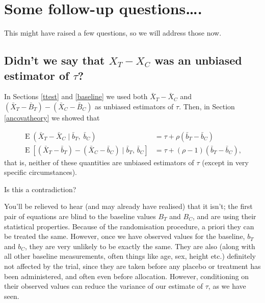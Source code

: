 \documentclass[
  openany]{book}
\theoremstyle{definition}
\theoremstyle{definition}
\theoremstyle{definition}
\theoremstyle{definition}
\theoremstyle{remark}
\begin{document}
\section{Some follow-up questions\ldots.}\label{some-follow-up-questions.}

This might have raised a few questions, so we will address those now.

\subsection{\texorpdfstring{Didn't we say that \(X_T - X_C\) was an unbiased estimator of \(\tau\)?}{Didn't we say that X\_T - X\_C was an unbiased estimator of \textbackslash tau?}}\label{didnt-we-say-that-x_t---x_c-was-an-unbiased-estimator-of-tau}

In Sections \ref{ttest} and \ref{baseline} we used both \(\bar{X}_T - \bar{X}_C\) and \(\left(\bar{X}_T - \bar{B}_T\right) - \left(\bar{X}_C - \bar{B}_C\right)\) as unbiased estimators of \(\tau\).
Then, in Section \ref{ancovatheory} we showed that

\[
\begin{aligned}
\operatorname{E}\left(\bar{X}_T - \bar{X}_C\mid{\bar{b}_T,\;\bar{b}_C}\right)& = \tau + \rho\left(\bar{b}_T - \bar{b}_C\right)\\
\operatorname{E}\left[\left(\bar{X}_T - \bar{b}_T\right) - \left(\bar{X}_C - \bar{b}_C\right)\mid{\bar{b}_T,\,\bar{b}_C}\right] &= \tau + \left(\rho-1\right)\left(\bar{b}_T - \bar{b}_C\right),
\end{aligned}
\]
that is, neither of these quantities are unbiased estimators of \(\tau\) (except in very specific circumstances).

Is this a contradiction?

You'll be relieved to hear (and may already have realised) that it isn't; the first pair of equations are blind to the baseline values \(B_T\) and \(B_C\), and are using their statistical properties. Because of the randomisation procedure, a priori they can be treated the same. However, once we have observed values for the baseline, \(b_T\) and \(b_C\), they are very unlikely to be exactly the same. They are also (along with all other baseline measurements, often things like age, sex, height etc.) definitely not affected by the trial, since they are taken before any placebo or treatment has been administered, and often even before allocation. However, conditioning on their observed values can reduce the variance of our estimate of \(\tau\), as we have seen.
\end{document}
